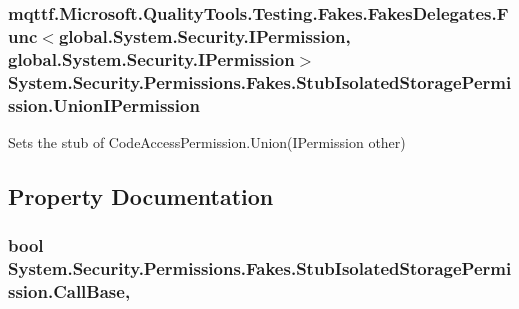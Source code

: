 \hypertarget{class_system_1_1_security_1_1_permissions_1_1_fakes_1_1_stub_isolated_storage_permission_a3db65a9f6557917e2ce85149bd47f9aa}{
\subsubsection[{Union\-I\-Permission}]{\setlength{\rightskip}{0pt plus 5cm}mqttf.\-Microsoft.\-Quality\-Tools.\-Testing.\-Fakes.\-Fakes\-Delegates.\-Func$<$global.\-System.\-Security.\-I\-Permission, global.\-System.\-Security.\-I\-Permission$>$ System.\-Security.\-Permissions.\-Fakes.\-Stub\-Isolated\-Storage\-Permission.\-Union\-I\-Permission}}\label{class_system_1_1_security_1_1_permissions_1_1_fakes_1_1_stub_isolated_storage_permission_a3db65a9f6557917e2ce85149bd47f9aa}


Sets the stub of Code\-Access\-Permission.\-Union(\-I\-Permission other)



\subsection{Property Documentation}
\hypertarget{class_system_1_1_security_1_1_permissions_1_1_fakes_1_1_stub_isolated_storage_permission_af4ad8358b1e7a1df10043b8a935ecba2}{
\subsubsection[{Call\-Base}]{\setlength{\rightskip}{0pt plus 5cm}bool System.\-Security.\-Permissions.\-Fakes.\-Stub\-Isolated\-Storage\-Permission.\-Call\-Base\hspace{0.3cm}{\ttfamily [get]}, {\ttfamily [set]}}}\label{class_system_1_1_security_1_1_permissions_1_1_fakes_1_1_stub_isolated_storage_permission_af4ad8358b1e7a1df10043b8a935ecba2}


